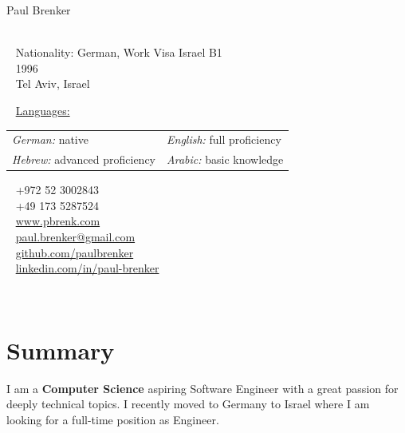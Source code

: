 \documentclass{style/modernsimplecv}
\begin{document}
\begin{minipage}[t]{0.79\textwidth}
    \vspace{0pt}
    \begin{shaded*}
        \begin{minipage}[t]{0.44\textwidth}
            \vspace{0pt}
            {\par\centering\huge{Paul Brenker}} \\[0.3cm]
            \faGlobe~ Nationality: German, Work Visa Israel B1\\
            \faBirthdayCake~ 1996 \\
            \faMapMarker~ Tel Aviv, Israel \\
            \begin{spacing}{0.5}
                {
                    \faCommentsO~ \underline{Languages:} \\
                    \begin{tabular}{l l}
                        \emph{German:} native & \emph{English:} full proficiency \\
                        \emph{Hebrew:} advanced proficiency & \emph{Arabic:} basic knowledge \\ 
                    \end{tabular}
                }
            \end{spacing}
            \vspace{4pt}
        \end{minipage}\hfill
        \begin{minipage}[t]{0.39\textwidth}
            \vspace{29pt} 
            \faPhone~ +972 52 3002843 \\
            \faPhone~ +49 173 5287524 \\

            \faLink~ \protect\url{www.pbrenk.com}\\
            \faAt~ \protect\url{paul.brenker@gmail.com} \\
            \faGithub~ \protect\url{github.com/paulbrenker} \\
            \faLinkedin~ \protect\url{linkedin.com/in/paul-brenker}\\
        \end{minipage}
        \hfill
    \end{shaded*}
\end{minipage}\\
\bigskip
\begin{minipage}{0.99\textwidth}
\section*{Summary}
    I am a \textbf{Computer Science} aspiring Software Engineer with a great passion for deeply technical topics. I recently moved to Germany to Israel where I am looking for a full-time position as Engineer. \lorem\lorem\lorem\lorem
\end{minipage}
\end{document}

